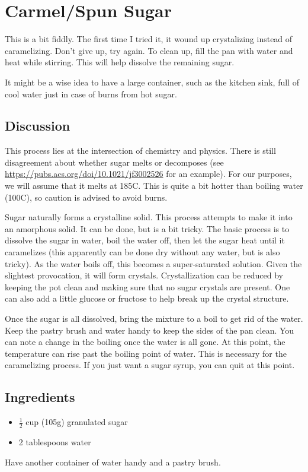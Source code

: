 \documentclass[10pt, openany]{book}
\begin{document}
\section{Carmel/Spun Sugar}
This is a bit fiddly.  The first time I tried it, it wound up crystalizing instead of caramelizing.  Don't give up, try again.  To clean up, fill the pan with water and heat while stirring.  This will help dissolve the remaining sugar.

It might be a wise idea to have a large container, such as the kitchen sink, full of cool water just in case of burns from hot sugar.

\subsection{Discussion}
This process lies at the intersection of chemistry and physics.  There is still disagreement about whether sugar melts or decomposes (see \url{https://pubs.acs.org/doi/10.1021/jf3002526} for an example).  For our purposes, we will assume that it melts at 185\degree{}C.  This is quite a bit hotter than boiling water (100\degree{}C), so caution is advised to avoid burns.

Sugar naturally forms a crystalline solid.  This process attempts to make it into an amorphous solid.  It can be done, but is a bit tricky.  The basic process is to dissolve the sugar in water, boil the water off, then let the sugar heat until it caramelizes (this apparently can be done dry without any water, but is also tricky).  As the water boils off, this becomes a super-saturated solution.  Given the slightest provocation, it will form crystals.  Crystallization can be reduced by keeping the pot clean and making sure that no sugar crystals are present.  One can also add a little glucose or fructose to help break up the crystal structure.

Once the sugar is all dissolved, bring the mixture to a boil to get rid of the water.  Keep the pastry brush and water handy to keep the sides of the pan clean.  You can note a change in the boiling once the water is all gone.  At this point, the temperature can rise past the boiling point of water.  This is necessary for the caramelizing process.  If you just want a sugar syrup, you can quit at this point.

\subsection{Ingredients}
\begin{itemize}
  \item $\frac{1}{2}$ cup (105g) granulated sugar
  \item 2 tablespoons water
\end{itemize}
Have another container of water handy and a pastry brush.
\end{document}
